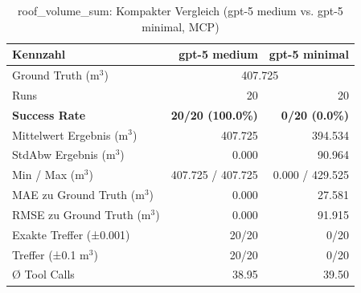 \begin{table}[htbp]
\centering
\scriptsize
\caption{roof\_volume\_sum: Kompakter Vergleich (gpt-5 medium vs. gpt-5 minimal, MCP)}
\begin{tabular}{lrr}
\toprule
Kennzahl & gpt-5 medium & gpt-5 minimal \\
\midrule
Ground Truth (m$^3$) & \multicolumn{2}{c}{407.725} \\
Runs & 20 & 20 \\
\textbf{Success Rate} & \textbf{20/20 (100.0\%)} & \textbf{0/20 (0.0\%)} \\
Mittelwert Ergebnis (m$^3$) & 407.725 & 394.534 \\
StdAbw Ergebnis (m$^3$) & 0.000 & 90.964 \\
Min / Max (m$^3$) & 407.725 / 407.725 & 0.000 / 429.525 \\
MAE zu Ground Truth (m$^3$) & 0.000 & 27.581 \\
RMSE zu Ground Truth (m$^3$) & 0.000 & 91.915 \\
Exakte Treffer (±0.001) & 20/20 & 0/20 \\
Treffer (±0.1 m$^3$) & 20/20 & 0/20 \\
Ø Tool Calls & 38.95 & 39.50 \\
\bottomrule
\end{tabular}
\end{table}